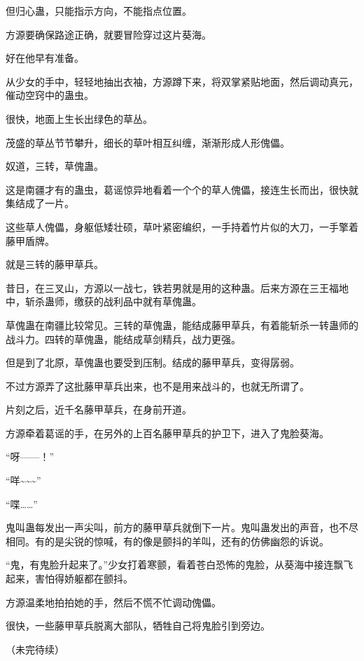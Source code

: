 \begin{this_body}
但归心蛊，只能指示方向，不能指点位置。

方源要确保路途正确，就要冒险穿过这片葵海。

好在他早有准备。

从少女的手中，轻轻地抽出衣袖，方源蹲下来，将双掌紧贴地面，然后调动真元，催动空窍中的蛊虫。

很快，地面上生长出绿色的草丛。

茂盛的草丛节节攀升，细长的草叶相互纠缠，渐渐形成人形傀儡。

奴道，三转，草傀蛊。

这是南疆才有的蛊虫，葛谣惊异地看着一个个的草人傀儡，接连生长而出，很快就集结成了一片。

这些草人傀儡，身躯低矮壮硕，草叶紧密编织，一手持着竹片似的大刀，一手擎着藤甲盾牌。

就是三转的藤甲草兵。

昔日，在三叉山，方源以一战七，铁若男就是用的这种蛊。后来方源在三王福地中，斩杀蛊师，缴获的战利品中就有草傀蛊。

草傀蛊在南疆比较常见。三转的草傀蛊，能结成藤甲草兵，有着能斩杀一转蛊师的战斗力。四转的草傀蛊，能结成草剑精兵，战力更强。

但是到了北原，草傀蛊也要受到压制。结成的藤甲草兵，变得孱弱。

不过方源弄了这批藤甲草兵出来，也不是用来战斗的，也就无所谓了。

片刻之后，近千名藤甲草兵，在身前开道。

方源牵着葛谣的手，在另外的上百名藤甲草兵的护卫下，进入了鬼脸葵海。

“呀——！”

“咩\~{}\~{}\~{}”

“喋……”

鬼叫蛊每发出一声尖叫，前方的藤甲草兵就倒下一片。鬼叫蛊发出的声音，也不尽相同。有的是尖锐的惊喊，有的像是颤抖的羊叫，还有的仿佛幽怨的诉说。

“鬼，有鬼脸升起来了。”少女打着寒颤，看着苍白恐怖的鬼脸，从葵海中接连飘飞起来，害怕得娇躯都在颤抖。

方源温柔地拍拍她的手，然后不慌不忙调动傀儡。

很快，一些藤甲草兵脱离大部队，牺牲自己将鬼脸引到旁边。

（未完待续）

\end{this_body}

